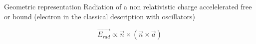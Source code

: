 \documentclass{beamer}
\begin{document}
\newcommand{\tikzAngleOfLine}{\tikz@AngleOfLine}
  \def\tikz@AngleOfLine(#1)(#2)#3{%
  \pgfmathanglebetweenpoints{%
    \pgfpointanchor{#1}{center}}{%
    \pgfpointanchor{#2}{center}}
  \pgfmathsetmacro{#3}{\pgfmathresult}%
  }



\begin{frame}{Geometric representation}
Radiation of a non relativistic charge accelelerated free or bound 
(electron in the classical description with oscillators) 


\begin{equation}
	\vec{E_{rad}} \propto  \vec{n} \times (\vec{n} \times \vec{a}) 
\end{equation}



\end{frame}
\end{document}
